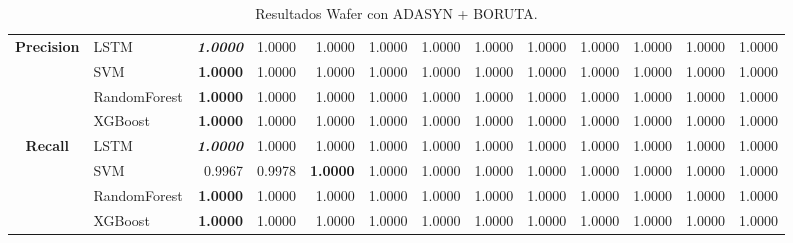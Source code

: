 \begin{table}[H]
\begin{adjustbox}{max width=14cm}
\begin{tabular}{|c|l|r|r|r|r|r|r|r|r|r|r|r|}
			\hline
			\textbf{Precision} &  LSTM & \textit{ \textbf{  1.0000 } } &  1.0000 &  1.0000 &  1.0000 &  1.0000 &  1.0000 &  1.0000 &  1.0000 &  1.0000 &  1.0000 &  1.0000 \\
			&  SVM & \textbf{  1.0000 } &  1.0000 &  1.0000 &  1.0000 &  1.0000 &  1.0000 &  1.0000 &  1.0000 &  1.0000 &  1.0000 &  1.0000 \\
			&  RandomForest & \textbf{  1.0000 } &  1.0000 &  1.0000 &  1.0000 &  1.0000 &  1.0000 &  1.0000 &  1.0000 &  1.0000 &  1.0000 &  1.0000 \\
			&  XGBoost & \textbf{  1.0000 } &  1.0000 &  1.0000 &  1.0000 &  1.0000 &  1.0000 &  1.0000 &  1.0000 &  1.0000 &  1.0000 &  1.0000 \\
			\hline
			\textbf{Recall} &  LSTM & \textit{ \textbf{  1.0000 } } &  1.0000 &  1.0000 &  1.0000 &  1.0000 &  1.0000 &  1.0000 &  1.0000 &  1.0000 &  1.0000 &  1.0000 \\
			&  SVM &  0.9967 &  0.9978 & \textbf{  1.0000 } &  1.0000 &  1.0000 &  1.0000 &  1.0000 &  1.0000 &  1.0000 &  1.0000 &  1.0000 \\
			&  RandomForest & \textbf{  1.0000 } &  1.0000 &  1.0000 &  1.0000 &  1.0000 &  1.0000 &  1.0000 &  1.0000 &  1.0000 &  1.0000 &  1.0000 \\
			&  XGBoost & \textbf{  1.0000 } &  1.0000 &  1.0000 &  1.0000 &  1.0000 &  1.0000 &  1.0000 &  1.0000 &  1.0000 &  1.0000 &  1.0000 \\
			\hline
		\end{tabular}
	\end{adjustbox}
	\caption{Resultados Wafer con ADASYN + BORUTA.}
	\label{tab:Wafer_ADASYN_BORUTA}
\end{table}

